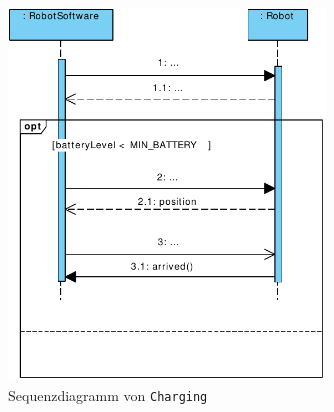 	
	\begin{figure}[H]
		\centering
		\includegraphics[width=0.75\textwidth]{img/0-Entwurf-8-Charging}
		\caption{Sequenzdiagramm von \texttt{Charging}}
		\label{Charging}
	\end{figure}
